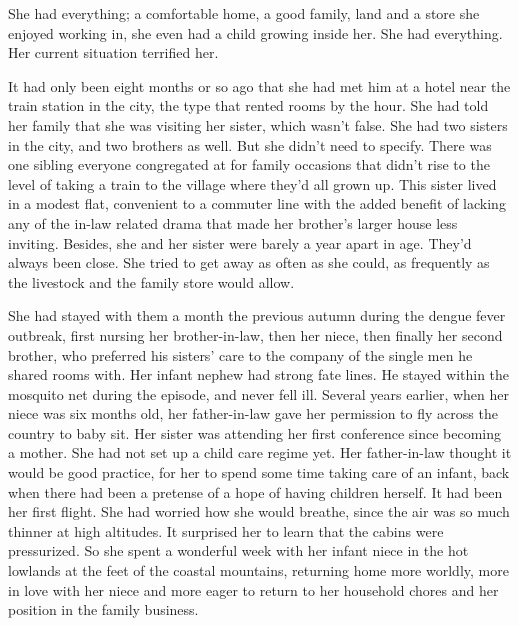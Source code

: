 \documentclass{article}
\begin{document}
She had everything; a comfortable home, a good family, land and a store she enjoyed working in, she even had a child growing inside her. She had everything. Her current situation terrified her.

It had only been eight months or so ago that she had met him at a hotel near the train station in the city, the type that rented rooms by the hour. She had told her family that she was visiting her sister, which wasn't false. She had two sisters in the city, and two brothers as well. But she didn't need to specify. There was one sibling everyone congregated at for family occasions that didn't rise to the level of taking a train to the village where they'd all grown up. This sister lived in a modest flat, convenient to a commuter line with the added benefit of lacking any of the in-law related drama that made her brother's larger house less inviting. Besides, she and her sister were barely a year apart in age. They'd always been close. She tried to get away as often as she could, as frequently as the livestock and the family store would allow. 

She had stayed with them a month the previous autumn during the dengue fever outbreak, first nursing her brother-in-law, then her niece, then finally her second brother, who preferred his sisters' care to the company of the single men he shared rooms with. Her infant nephew had strong fate lines. He stayed within the mosquito net during the episode, and never fell ill. Several years earlier, when her niece was six months old, her father-in-law gave her permission to fly across the country to baby sit. Her sister was attending her first conference since becoming a mother. She had not set up a child care regime yet. Her father-in-law thought it would be good practice, for her to spend some time taking care of an infant, back when there had been a pretense of a hope of having children herself. It had been her first flight. She had worried how she would breathe, since the air was so much thinner at high altitudes. It surprised her to learn that the cabins were pressurized. So she spent a wonderful week with her infant niece in the hot lowlands at the feet of the coastal mountains, returning home more worldly, more in love with her niece and more eager to return to her household chores and her position in the family business.
\end{document}
